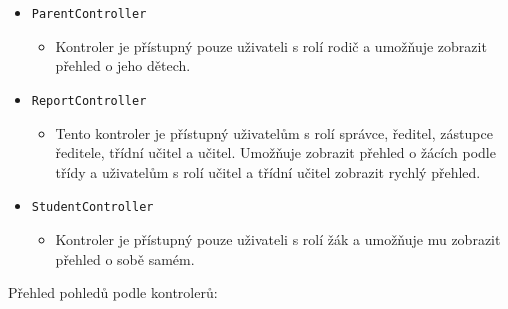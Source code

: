 \begin{itemize}
    \item \texttt{ParentController}
    \begin{itemize}
        \item Kontroler je přístupný pouze uživateli s rolí rodič a umožňuje zobrazit přehled o jeho dětech.
    \end{itemize}
    
    \item \texttt{ReportController}
    \begin{itemize}
        \item Tento kontroler je přístupný uživatelům s rolí správce, ředitel, zástupce ředitele, třídní učitel a učitel. Umožňuje zobrazit přehled o žácích podle třídy a uživatelům s rolí učitel a třídní učitel zobrazit rychlý přehled.
    \end{itemize}
    
    \item \texttt{StudentController}
    \begin{itemize}
        \item Kontroler je přístupný pouze uživateli s rolí žák a umožňuje mu zobrazit přehled o sobě samém.
    \end{itemize}
\end{itemize}

Přehled pohledů podle kontrolerů:

